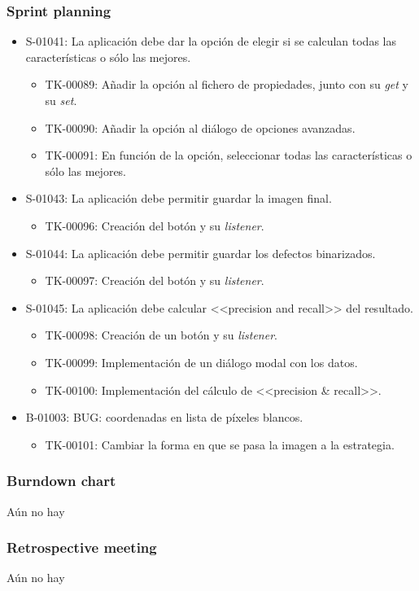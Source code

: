 \subsubsection*{Sprint planning}
\begin{itemize}
 \item S-01041: La aplicación debe dar la opción de elegir si se calculan todas las características o sólo las mejores.
  \begin{itemize}
   \item TK-00089: Añadir la opción al fichero de propiedades, junto con su \emph{get} y su \emph{set}.
   \item TK-00090: Añadir la opción al diálogo de opciones avanzadas.
   \item TK-00091: En función de la opción, seleccionar todas las características o sólo las mejores.
  \end{itemize}
 \item S-01043: La aplicación debe permitir guardar la imagen final.
  \begin{itemize}
   \item TK-00096: Creación del botón y su \textit{listener}.
  \end{itemize}
  \item S-01044: La aplicación debe permitir guardar los defectos binarizados.
  \begin{itemize}
   \item TK-00097: Creación del botón y su \textit{listener}.
  \end{itemize}
  \item S-01045: La aplicación debe calcular <<precision and recall>> del resultado.
  \begin{itemize}
   \item TK-00098: Creación de un botón y su \textit{listener}.
   \item TK-00099: Implementación de un diálogo modal con los datos.
   \item TK-00100: Implementación del cálculo de <<precision \& recall>>.
  \end{itemize}
 \item B-01003: BUG: coordenadas en lista de píxeles blancos.
  \begin{itemize}
   \item TK-00101: Cambiar la forma en que se pasa la imagen a la estrategia.
  \end{itemize}
\end{itemize}


\subsubsection*{Burndown chart}
Aún no hay


\subsubsection*{Retrospective meeting}
Aún no hay

